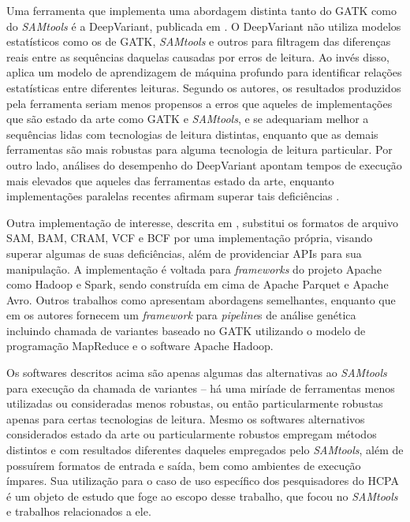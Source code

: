 \documentclass[cic,tc]{iiufrgs}
\begin{document}
Uma ferramenta que implementa uma abordagem distinta tanto do GATK como do
\textit{SAMtools} é a DeepVariant, publicada em \cite{poplin2018universal}. O DeepVariant
não utiliza modelos estatísticos como os de GATK, \textit{SAMtools} e outros para
filtragem das diferenças reais entre as sequências daquelas causadas por erros
de leitura. Ao invés disso, aplica um modelo de aprendizagem de máquina
profundo para identificar relações estatísticas entre diferentes leituras.
Segundo os autores, os resultados produzidos pela ferramenta seriam menos
propensos a erros que aqueles de implementações que são estado da arte como
GATK e \textit{SAMtools}, e se adequariam melhor a sequências lidas com tecnologias de
leitura distintas, enquanto que as demais ferramentas são mais robustas para
alguma tecnologia de leitura particular. Por outro lado, análises do desempenho
do DeepVariant apontam tempos de execução mais elevados que aqueles das
ferramentas estado da arte, enquanto implementações paralelas recentes afirmam
superar tais deficiências \cite{ahmad2021vc}.

Outra implementação de interesse, descrita em \cite{massie2013adam}, substitui
os formatos de arquivo SAM, BAM, CRAM, VCF e BCF por uma implementação própria,
visando superar algumas de suas deficiências, além de providenciar APIs para
sua manipulação. A implementação é voltada para \textit{frameworks} do projeto Apache
como Hadoop e Spark, sendo construída em cima de Apache Parquet e Apache Avro.
Outros trabalhos como \cite{boufea2017managing} apresentam abordagens
semelhantes, enquanto que em \cite{decap2015halvade} os autores fornecem um
\textit{framework} para \textit{pipeline}s de análise genética incluindo chamada de variantes
baseado no GATK utilizando o modelo de programação MapReduce e o software
Apache Hadoop.

Os softwares descritos acima são apenas algumas das alternativas ao \textit{SAMtools}
para execução da chamada de variantes -- há uma miríade de ferramentas menos
utilizadas ou consideradas menos robustas, ou então particularmente robustas
apenas para certas tecnologias de leitura. Mesmo os softwares alternativos
considerados estado da arte ou particularmente robustos empregam métodos
distintos e com resultados diferentes daqueles empregados pelo \textit{SAMtools}, além
de possuírem formatos de entrada e saída, bem como ambientes de execução
ímpares. Sua utilização para o caso de uso específico dos pesquisadores do HCPA
é um objeto de estudo que foge ao escopo desse trabalho, que focou no \textit{SAMtools}
e trabalhos relacionados a ele.
\end{document}
